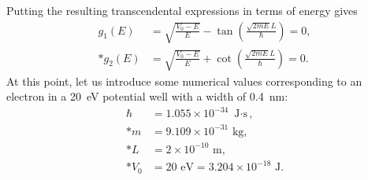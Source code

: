 Putting the resulting transcendental expressions in terms of energy gives
\begin{subequations}
\begin{align}
  g_1(E) &= \sqrt{ \frac{V_0 - E}{E} } - \tan \left( \frac{\sqrt{2mE}L}{\hbar} \right) = 0, \\*
  g_2(E) &= \sqrt{ \frac{V_0 - E}{E} } + \cot \left( \frac{\sqrt{2mE}L}{\hbar} \right) = 0.
\end{align}
\end{subequations}
At this point, let us introduce some numerical values corresponding to an electron in a 20~eV potential well with a width of 0.4~nm:
\begin{align}
  \hbar &= 1.055 \times 10^{-34} \text{ J$\cdot$s}, \nonumber \\*
      m &= 9.109 \times 10^{-31} \text{ kg}, \nonumber \\*
      L &= 2 \times 10^{-10} \text{ m}, \nonumber \\*
    V_0 &= 20 \text{ eV} = 3.204 \times 10^{-18} \text{ J}. \nonumber
\end{align}

